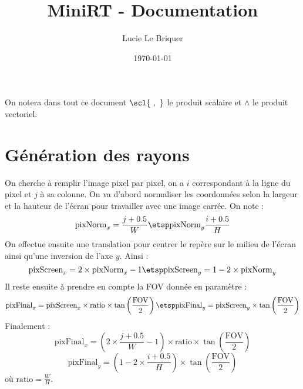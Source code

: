 

\title{\LARGE \textbf{MiniRT} - Documentation}
\author{\large Lucie Le Briquer}
\date{\today}


\maketitle
\tableofcontents
\newpage\rmk On notera dans tout ce document $\scl{\ ,\ }$ le produit scalaire et
$\wedge$ le produit vectoriel.
\section{Génération des rayons}
\begin{center}
\hspace{1cm}
\end{center}
\dd\ni On cherche à remplir l'image pixel par pixel, on a $i$ correspondant à la
ligne du pixel et $j$ à sa colonne. On va d'abord normaliser les coordonnées
selon la largeur et la hauteur de l'écran pour travailler avec une image carrée.
On note :
$$\text{pixNorm}_x=\frac{j + 0.5} W \etsp\text{pixNorm}_y\frac{i + 0.5} H$$
\ni On effectue ensuite une translation pour centrer le repère sur le milieu de
l'écran ainsi qu'une inversion de l'axe $y$. Ainsi :
$$\text{pixScreen}_x=2 \times\text{pixNorm}_x -1 \etsp \text{pixScreen}_y = 1 -
2\times \text{pixNorm}_y$$
\ni Il reste ensuite à prendre en compte la FOV donnée en paramètre :
$$\text{pixFinal}_x = \text{pixScreen}_x \times \text{ratio}
\times\tan\left(\frac{\text{FOV}} 2\right)\etsp \text{pixFinal}_y = 
\text{pixScreen}_y \times\tan\left(\frac{\text{FOV}} 2\right)$$
\ni Finalement :
$$\text{pixFinal}_x = \left(2\times \frac{j+0.5}{W}- 1\right)
\times \text{ratio}\times\tan\left(\frac{\text{FOV}} 2\right)$$
$$\text{pixFinal}_y = \left(1 - 2\times \frac{i+0.5}{H}\right)
\times\tan\left(\frac{\text{FOV}} 2\right)$$
\ni où $\text{ratio} = \frac W H$.


